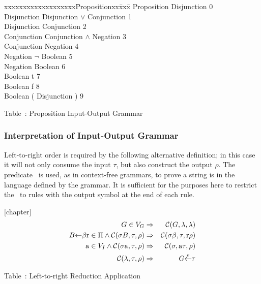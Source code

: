 \begin{samepage}
\begin{em}
\begin{tabbing}
xxxxxxxxxxxxxxxxxxx\=Propositionxx\=xxx\=\kill
\>Proposition \>\la\> Disjunction                      {\rm 0}  \\        
\>Disjunction \>\la\> Disjunction $\vee$ Conjunction   {\rm 1}  \\
\>Disjunction \>\la\> Conjunction                      {\rm 2}  \\
\>Conjunction \>\la\> Conjunction $\wedge$ Negation    {\rm 3}  \\
\>Conjunction \>\la\> Negation                         {\rm 4}  \\
\>Negation    \>\la\> $\neg$ Boolean                   {\rm 5}  \\
\>Negation    \>\la\> Boolean                          {\rm 6}  \\
\>Boolean     \>\la\> {\rm t}                          {\rm 7}  \\
\>Boolean     \>\la\> {\rm f}                          {\rm 8}  \\
\>Boolean     \>\la\> {\rm(} Disjunction {\rm)}        {\rm 9}
\end{tabbing}
\end{em}

\begin{center}
Table~\thetable: Proposition Input-Output Grammar
\end{center}
\end{samepage}


\subsubsection{Interpretation of Input-Output Grammar}

Left-to-right order is required by the following 
alternative definition; 
in this case it will not only consume the input $\tau$, 
but also construct the output $\rho$.
The predicate \sform\ is used, as in context-free grammars,
to prove a string is in the language defined by the grammar.
It is sufficient for the purposes here to restrict the \iog\
to rules with the output symbol at the end of each rule.

{}[chapter]
\setcounter{reductions}{\value{table}}
\begin{eqnarray*}
  G \in V_G &\Rightarrow& {\mbox{$\cal C$}}(G, \lambda, \lambda)          \\
  B\mbox{$\leftarrow$}\beta{\rm r}  \in \Pi \wedge {\mbox{$\cal C$}}(\sigma B, \tau, \rho) 
      &\Rightarrow& {\mbox{$\cal C$}}(\sigma\beta, \tau, {\rm r}\rho)            \\
  {\rm a} \in V_I \wedge {\mbox{$\cal C$}}(\sigma {\rm a}, \tau, \rho)
      &\Rightarrow& {\mbox{$\cal C$}}(\sigma, {\rm a}\tau, \rho)           \\
  {\mbox{$\cal C$}}(\lambda, \tau, \rho) &\Rightarrow& G {\stackrel{\rho}{\mbox{$\leftarrow$}}} \tau
\end{eqnarray*}
\begin{center}
Table~\thetable: Left-to-right Reduction Application
\end{center}

